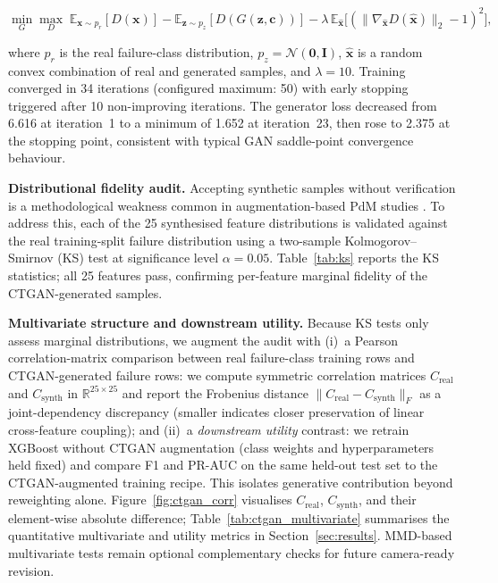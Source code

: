 \documentclass[sensors,article,submit,pdftex,moreauthors]{Definitions/mdpi}
\begin{document}
\begin{linenomath}
\begin{equation}
\min_G \max_D\;
  \mathbb{E}_{\mathbf{x} \sim p_r}[D(\mathbf{x})]
  - \mathbb{E}_{\mathbf{z} \sim p_z}[D(G(\mathbf{z},\mathbf{c}))]
  - \lambda\,\mathbb{E}_{\hat{\mathbf{x}}}
    \bigl[(\|\nabla_{\hat{\mathbf{x}}}D(\hat{\mathbf{x}})\|_2 - 1)^2\bigr],
\label{eq:ctgan-wgan}
\end{equation}
\end{linenomath}

\noindent where $p_r$ is the real failure-class distribution,
$p_z = \mathcal{N}(\mathbf{0}, \mathbf{I})$, $\hat{\mathbf{x}}$ is a
random convex combination of real and generated samples, and
$\lambda = 10$.
Training converged in 34 iterations (configured maximum: 50) with
early stopping triggered after 10 non-improving iterations.
The generator loss decreased from 6.616 at iteration~1 to a minimum
of 1.652 at iteration~23, then rose to 2.375 at the stopping point,
consistent with typical GAN saddle-point convergence behaviour.

\textbf{Distributional fidelity audit.}
Accepting synthetic samples without verification is a methodological
weakness common in augmentation-based PdM studies \citep{ref-ctgan-steel2025}.
To address this, each of the 25 synthesised feature distributions is
validated against the real training-split failure distribution using a
two-sample Kolmogorov--Smirnov (KS) test at significance level
$\alpha = 0.05$.
Table~\ref{tab:ks} reports the KS statistics; all 25 features pass,
confirming per-feature marginal fidelity of the CTGAN-generated
samples.

\textbf{Multivariate structure and downstream utility.}
Because KS tests only assess marginal distributions, we augment the
audit with (i)~a Pearson correlation-matrix comparison between
real failure-class training rows and CTGAN-generated failure rows:
we compute symmetric correlation matrices $C_{\mathrm{real}}$ and
$C_{\mathrm{synth}}$ in $\mathbb{R}^{25 \times 25}$ and report the
Frobenius distance
$\lVert C_{\mathrm{real}} - C_{\mathrm{synth}}\rVert_F$ as a
joint-dependency discrepancy (smaller indicates closer preservation of
linear cross-feature coupling); and (ii)~a \emph{downstream utility}
contrast: we retrain XGBoost without CTGAN augmentation (class
weights and hyperparameters held fixed) and compare F1 and PR-AUC on
the same held-out test set to the CTGAN-augmented training recipe.
This isolates generative contribution beyond reweighting alone.
Figure~\ref{fig:ctgan_corr} visualises $C_{\mathrm{real}}$,
$C_{\mathrm{synth}}$, and their element-wise absolute difference;
Table~\ref{tab:ctgan_multivariate} summarises the quantitative
multivariate and utility metrics in Section~\ref{sec:results}.
MMD-based multivariate tests \citep{ref-mmd-synthetic2022} remain
optional complementary checks for future camera-ready revision.
\end{document}
